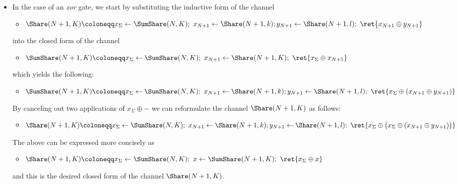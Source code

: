\begin{itemize}
\item In the case of an \emph{xor} gate, we start by substituting the inductive form of the channel
\begin{itemize}
\item $\Share(N+1,K) \coloneqq x_\Sigma \leftarrow \SumShare(N,K); \ x_{N+1} \leftarrow \Share(N+1,k); \\ y_{N+1} \leftarrow \Share(N+1,l); \ \ret{x_{N+1} \oplus y_{N+1}}$
\end{itemize}
into the closed form of the channel
\begin{itemize}
\item $\SumShare(N+1,K) \coloneqq x_\Sigma \leftarrow \SumShare(N,K); \ x_{N+1} \leftarrow \Share(N+1,K); \ \ret{x_\Sigma \oplus x_{N+1}}$
\end{itemize}
which yields the following:
\begin{itemize}
\item $\SumShare(N+1,K) \coloneqq x_\Sigma \leftarrow \SumShare(N,K); \ x_{N+1} \leftarrow \Share(N+1,k); \\ y_{N+1} \leftarrow \Share(N+1,l); \ \ret{x_\Sigma \oplus (x_{N+1} \oplus y_{N+1})}$
\end{itemize}
By canceling out two applications of $x_\Sigma \oplus -$ we can reformulate the channel $\Share(N+1,K)$ as follows:
\begin{itemize}
\item $\Share(N+1,K) \coloneqq x_\Sigma \leftarrow \SumShare(N,K); \ x_{N+1} \leftarrow \Share(N+1,k); \\ y_{N+1} \leftarrow \Share(N+1,l); \ \ret{x_\Sigma \oplus \big(x_\Sigma \oplus (x_{N+1} \oplus y_{N+1})\big)}$
\end{itemize}
The above can be expressed more concisely as
\begin{itemize}
\item $\Share(N+1,K) \coloneqq x_\Sigma \leftarrow \SumShare(N,K); \ x \leftarrow \SumShare(N+1,K); \ \ret{x_\Sigma \oplus x}$
\end{itemize}
and this is the desired closed form of the channel $\Share(N+1,K)$.


\end{itemize}
